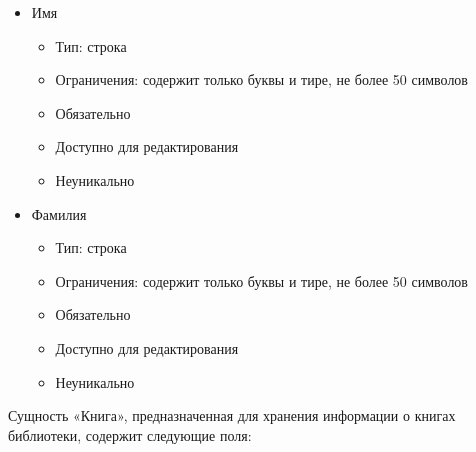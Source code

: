 \documentclass[data-specification.tex]{subfiles}
\begin{document}
\begin{itemize}
    \item Имя
    \begin{itemize}
        \item Тип: строка
        \item Ограничения: содержит только буквы и тире, не более 50 символов
        \item Обязательно
        \item Доступно для редактирования
        \item Неуникально
    \end{itemize}
    \item Фамилия
    \begin{itemize}
        \item Тип: строка
        \item Ограничения: содержит только буквы и тире, не более 50 символов
        \item Обязательно
        \item Доступно для редактирования
        \item Неуникально
    \end{itemize}
\end{itemize}
\par
Сущность «Книга», предназначенная для хранения информации о книгах библиотеки, содержит следующие поля:
\end{document}
